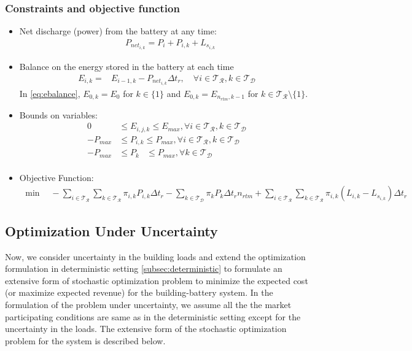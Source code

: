 \documentclass[11pt,twoside]{article}
\begin{document}
\subsubsection{Constraints and objective function}
\begin{itemize}
\item Net discharge (power) from the battery at any time:
\begin{align}
&P_{{net}_{i,k}} = P_{i} + P_{i,k} + L_{s_{i,k}}
\end{align}
\label{eq:Pnet}
\item Balance on the energy stored in the battery at each time
\begin{align}
E_{i,k} =& E_{i-1,k}- P_{{net}_{i,k}}\Delta t_r, \quad \forall i \in \mathcal{T_R}, k \in \mathcal{T_D}
\end{align}
\label{eq:ebalance}
In \ref{eq:ebalance}, $E_{0,k} = E_{0}$ for $k \in \lbrace1\rbrace$ and $E_{0,k} = E_{n_{rtm},k-1}$ for $k \in \mathcal{T_R}\setminus{\lbrace1\rbrace}$. 
\item Bounds on variables:
\begin{subequations}
\begin{align}
0 & \leq E_{i,j,k} \leq E_{max}, \forall i \in \mathcal{T_R}, k \in \mathcal{T_D}\\
-P_{max} & \leq P_{i,k} \leq P_{max}, \forall i \in \mathcal{T_R}, k \in \mathcal{T_D}\\
-P_{max} & \leq P_{k}\phantom{i,} \leq P_{max}, \forall k \in \mathcal{T_D}\\
\end{align}
\label{eq:bounds}
\end{subequations}
\item Objective Function:
\begin{align}
\min \quad -\sum\limits_{i \in \mathcal{T_R}}\sum\limits_{k \in \mathcal{T_R}} \pi_{i,k}P_{i,k}\Delta t_r - \sum\limits_{k \in \mathcal{T_D}}\pi_{k}P_{k}\Delta t_r n_{rtm} + \sum\limits_{i \in \mathcal{T_R}}\sum\limits_{k \in \mathcal{T_R}} \pi_{i,k}(L_{i,k}-L_{s_{i,k}})\Delta t_r
\end{align}
\label{objective}
\end{itemize}

\subsection{Optimization Under Uncertainty}
Now, we consider uncertainty in the building loads and extend the optimization formulation in deterministic setting \ref{subsec:deterministic} to formulate an extensive form of stochastic optimization problem to minimize the expected cost (or maximize expected revenue) for the building-battery system. In the formulation of the problem under uncertainty, we assume all the the market participating conditions are same as in the deterministic setting except for the uncertainty in the loads. The extensive form of the stochastic optimization problem for the system is described below.
\end{document}
